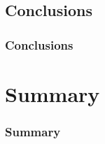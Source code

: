 \documentclass{beamer}
\begin{document}
\subsection{Conclusions}
\begin{frame}
\frametitle{Conclusions}

\end{frame}


\section{Summary}

\begin{frame}
\frametitle{Summary}

\end{frame}
\end{document}
